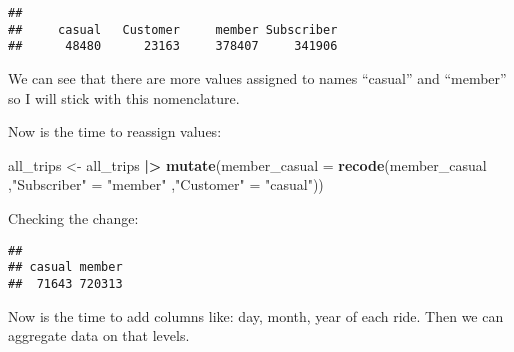 \documentclass[
]{article}
\newenvironment{Shaded}{\begin{snugshade}}{\end{snugshade}}
\newcommand{\AttributeTok}[1]{\textcolor[rgb]{0.13,0.29,0.53}{#1}}
\newcommand{\FunctionTok}[1]{\textcolor[rgb]{0.13,0.29,0.53}{\textbf{#1}}}
\newcommand{\NormalTok}[1]{#1}
\newcommand{\OtherTok}[1]{\textcolor[rgb]{0.56,0.35,0.01}{#1}}
\newcommand{\SpecialCharTok}[1]{\textcolor[rgb]{0.81,0.36,0.00}{\textbf{#1}}}
\newcommand{\StringTok}[1]{\textcolor[rgb]{0.31,0.60,0.02}{#1}}
\begin{document}
\begin{Shaded}
\end{Shaded}

\begin{verbatim}
## 
##     casual   Customer     member Subscriber 
##      48480      23163     378407     341906
\end{verbatim}

We can see that there are more values assigned to names ``casual'' and
``member'' so I will stick with this nomenclature.

Now is the time to reassign values:

\begin{Shaded}
\begin{Highlighting}[]
\NormalTok{all\_trips }\OtherTok{\textless{}{-}}\NormalTok{ all\_trips }\SpecialCharTok{|\textgreater{}} 
  \FunctionTok{mutate}\NormalTok{(}\AttributeTok{member\_casual =} \FunctionTok{recode}\NormalTok{(member\_casual}
\NormalTok{         ,}\StringTok{"Subscriber"} \OtherTok{=} \StringTok{"member"}
\NormalTok{         ,}\StringTok{"Customer"} \OtherTok{=} \StringTok{"casual"}\NormalTok{))}
\end{Highlighting}
\end{Shaded}

Checking the change:

\begin{Shaded}
\end{Shaded}

\begin{verbatim}
## 
## casual member 
##  71643 720313
\end{verbatim}

Now is the time to add columns like: day, month, year of each ride. Then
we can aggregate data on that levels.
\end{document}
